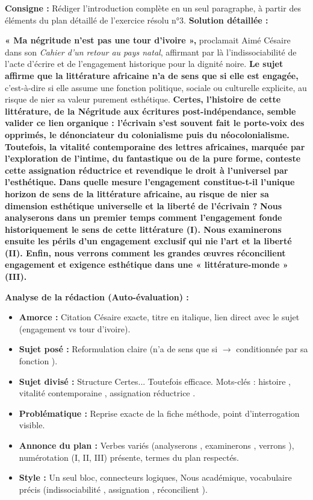 \documentclass[11pt]{article}
\begin{document}
\begin{exoresolu}
\textbf{Consigne :} Rédiger l'introduction complète en un seul paragraphe, à partir des éléments du plan détaillé de l'exercice résolu n°3.
\tcblower
\textbf{Solution détaillée :}

\og \textbf{« Ma négritude n'est pas une tour d'ivoire »,} proclamait Aimé Césaire dans son \emph{Cahier d'un retour au pays natal}, affirmant par là l'indissociabilité de l'acte d'écrire et de l'engagement historique pour la dignité noire. \textbf{Le sujet affirme que la littérature africaine n'a de sens que si elle est engagée,} c'est-à-dire si elle assume une fonction politique, sociale ou culturelle explicite, au risque de nier sa valeur purement esthétique. \textbf{Certes, l'histoire de cette littérature, de la Négritude aux écritures post-indépendance, semble valider ce lien organique : l'écrivain s'est souvent fait le porte-voix des opprimés, le dénonciateur du colonialisme puis du néocolonialisme.} \textbf{Toutefois, la vitalité contemporaine des lettres africaines, marquée par l'exploration de l'intime, du fantastique ou de la pure forme, conteste cette assignation réductrice et revendique le droit à l'universel par l'esthétique.} \textbf{Dans quelle mesure l'engagement constitue-t-il l'unique horizon de sens de la littérature africaine, au risque de nier sa dimension esthétique universelle et la liberté de l'écrivain ?} \textbf{Nous analyserons dans un premier temps comment l'engagement fonde historiquement le sens de cette littérature (I). Nous examinerons ensuite les périls d'un engagement exclusif qui nie l'art et la liberté (II). Enfin, nous verrons comment les grandes œuvres réconcilient engagement et exigence esthétique dans une « littérature-monde » (III).} \fg

\textbf{Analyse de la rédaction (Auto-évaluation) :}
\begin{itemize}
    \item \textbf{Amorce :} Citation Césaire exacte, titre en italique, lien direct avec le sujet (engagement vs tour d'ivoire).
    \item \textbf{Sujet posé :} Reformulation claire (\og n'a de sens que si \fg $\rightarrow$ \og conditionnée par sa fonction \fg).
    \item \textbf{Sujet divisé :} Structure \og Certes... Toutefois \fg efficace. Mots-clés : \og histoire \fg, \og vitalité contemporaine \fg, \og assignation réductrice \fg.
    \item \textbf{Problématique :} Reprise exacte de la fiche méthode, point d'interrogation visible.
    \item \textbf{Annonce du plan :} Verbes variés (\og analyserons \fg, \og examinerons \fg, \og verrons \fg), numérotation (I, II, III) présente, termes du plan respectés.
    \item \textbf{Style :} Un seul bloc, connecteurs logiques, \og Nous \fg académique, vocabulaire précis (\og indissociabilité \fg, \og assignation \fg, \og réconcilient \fg).
\end{itemize}
\end{exoresolu}
\end{document}
